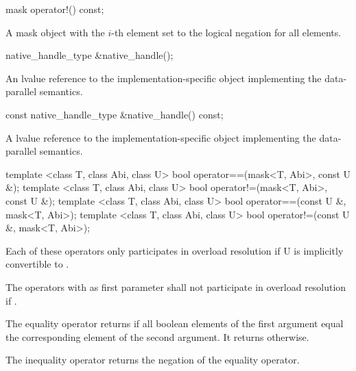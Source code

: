 \begin{itemdecl}
mask operator!() const;
\end{itemdecl}
\begin{itemdescr}
  \pnum\returns A mask object with the $i$-th element set to the logical negation for all elements.
\end{itemdescr}

\begin{itemdecl}
native_handle_type &native_handle();
\end{itemdecl}
\begin{itemdescr}
  \pnum\returns An lvalue reference to the implementation-specific object implementing the data-parallel semantics.
\end{itemdescr}

\begin{itemdecl}
const native_handle_type &native_handle() const;
\end{itemdecl}
\begin{itemdescr}
  \pnum\returns A \const lvalue reference to the implementation-specific object implementing the data-parallel semantics.
\end{itemdescr}


\begin{itemdecl}
template <class T, class Abi, class U> bool operator==(mask<T, Abi>, const U &);
template <class T, class Abi, class U> bool operator!=(mask<T, Abi>, const U &);
template <class T, class Abi, class U> bool operator==(const U &, mask<T, Abi>);
template <class T, class Abi, class U> bool operator!=(const U &, mask<T, Abi>);
\end{itemdecl}
\begin{itemdescr}
  \pnum\remarks Each of these operators only participates in overload resolution if \type U is implicitly convertible to \mask[<T, Abi>].

  \pnum\remarks The operators with  as first parameter shall not participate in overload resolution if .

  \pnum\returns The equality operator returns \true if all boolean elements of the first argument equal the corresponding element of the second argument.
  It returns \false otherwise.

  \pnum\returns The inequality operator returns the negation of the equality operator.
\end{itemdescr}

